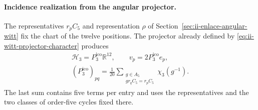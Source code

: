 \paragraph{Incidence realization from the angular projector.}
The representatives \(r_pC_5\) and representation \(\rho\) of
Section~\ref{sec:ii-enlace-angular-witt} fix the chart of the twelve
positions. The projector already defined by
\eqref{eq:ii-witt-projector-character} produces
\begin{equation}
 \begin{gathered}
 \mathcal H_3=P_3^{\mathrm{ico}}\mathbb R^{12},\qquad v_p=2P_3^{\mathrm{ico}}e_p,
 \\[-2pt]
 (P_3^{\mathrm{ico}})_{pq}=\frac1{20}
 \sum_{\substack{g\in A_5\\gr_qC_5=r_pC_5}}\chi_3(g^{-1}).
 \end{gathered}
 \label{ii:dodeca:vertices-proyector}
\end{equation}
The last sum contains five terms per entry and uses the
representatives and the two classes of order-five cycles fixed there.


